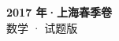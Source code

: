 \documentclass[zihao=-4, a4paper]{ctexart}
\begin{document}
\begin{center}
  {\Large\bfseries 2017 年·上海春季卷}\\[4pt]
  {\large 数学 · 试题版}
\end{center}
\medskip
{}

\end{document}
